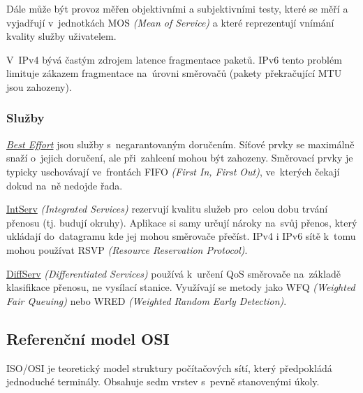 Dále může být provoz měřen objektivními a subjektivními testy, které se měří a vyjadřují v~jednotkách MOS \emph{(Mean of Service)} a které reprezentují vnímání kvality služby uživatelem.

V~IPv4 bývá častým zdrojem latence fragmentace paketů.
IPv6 tento problém limituje zákazem fragmentace na~úrovni směrovačů (pakety překračující MTU jsou zahozeny).


\subsubsection{Služby}

\underline{\emph{Best Effort}} jsou služby s~negarantovaným doručením.
Síťové prvky se maximálně snaží o~jejich doručení, ale při~zahlcení mohou být zahozeny.
Směrovací prvky je typicky uschovávají ve~frontách FIFO \emph{(First In, First Out)}, ve~kterých čekají dokud na~ně nedojde řada.

\underline{IntServ} \emph{(Integrated Services)} rezervují kvalitu služeb pro~celou dobu trvání přenosu (tj. budují okruhy).
Aplikace si samy určují nároky na~svůj přenos, který ukládají do~datagramu kde jej mohou směrovače přečíst.
IPv4 i IPv6 sítě k~tomu mohou používat RSVP \emph{(Resource Reservation Protocol)}.

\underline{DiffServ} \emph{(Differentiated Services)} používá k~určení QoS směrovače na~základě klasifikace přenosu, ne vysílací stanice.
Využívají se metody jako WFQ \emph{(Weighted Fair Queuing)} nebo WRED \emph{(Weighted Random Early Detection)}.


\subsection{Referenční model OSI}

ISO/OSI je teoretický model struktury počítačových sítí, který předpokládá jednoduché terminály.
Obsahuje sedm vrstev s~pevně stanovenými úkoly.

